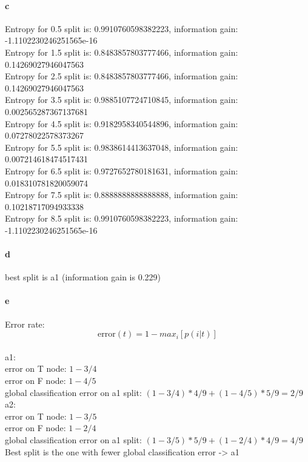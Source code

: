 \documentclass[a4paper, 10pt]{article}
\begin{document}
\paragraph{c}
Entropy for 0.5 split is: 0.9910760598382223, information gain: -1.1102230246251565e-16
\\
Entropy for 1.5 split is: 0.8483857803777466, information gain: 0.14269027946047563
\\
Entropy for 2.5 split is: 0.8483857803777466, information gain: 0.14269027946047563
\\
Entropy for 3.5 split is: 0.9885107724710845, information gain: 0.002565287367137681
\\
Entropy for 4.5 split is: 0.9182958340544896, information gain: 0.07278022578373267
\\
Entropy for 5.5 split is: 0.9838614413637048, information gain: 0.007214618474517431
\\
Entropy for 6.5 split is: 0.9727652780181631, information gain: 0.018310781820059074
\\
Entropy for 7.5 split is: 0.8888888888888888, information gain: 0.10218717094933338
\\
Entropy for 8.5 split is: 0.9910760598382223, information gain: -1.1102230246251565e-16

\paragraph{d}

best split is a1 (information gain is 0.229)

\paragraph{e}
Error rate:
$$
\text{error}(t) = 1 - {max}_i [p(i\vert t)]
$$
\\
a1: 
\\
error on T node: $1-3/4$
\\
error on F node: $1-4/5$
\\
global classification error on a1 split: $ (1-3/4)*4/9 + (1-4/5)*5/9 = 2/9$
\\
a2: 
\\
error on T node: $1-3/5$
\\
error on F node: $1-2/4$
\\
global classification error on a1 split: $ (1-3/5)*5/9 + (1-2/4)*4/9 = 4/9$
\\
Best split is the one with fewer global classification error -> a1
\end{document}
